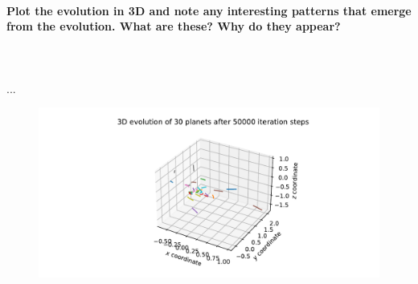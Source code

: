     \paragraph{Plot the evolution in 3D and note any interesting patterns that 
        emerge from the evolution. What are these? Why do they appear?
    } \ \\
        \\
        ...
        \begin{figure}[h!]
            \centering
            \includegraphics[width=\textwidth]{./figures/task2_30body_3D_new.pdf}
        \end{figure} \ \\ 

    \newpage
